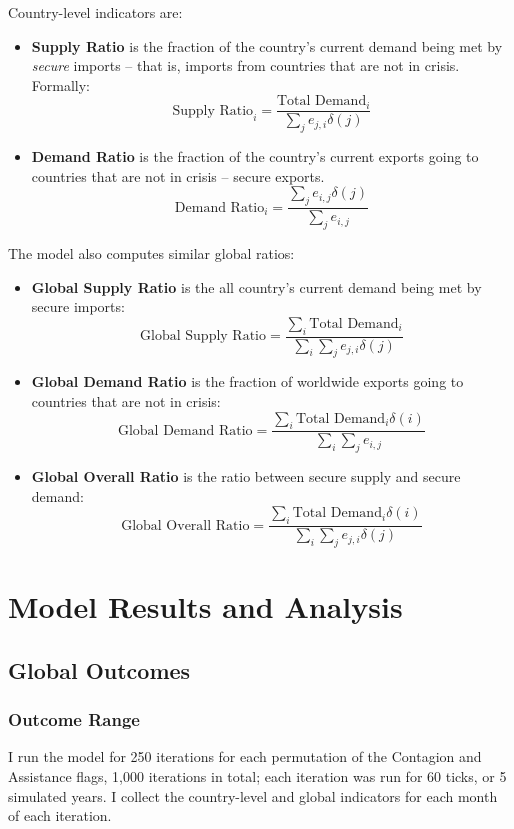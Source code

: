 \documentclass{article}
\begin{document}
Country-level indicators are:

\begin{itemize}
	\item \textbf{Supply Ratio} is the fraction of the country's current demand being met by \emph{secure} imports -- that is, imports from countries that are not in crisis. Formally:
	$$
		\text{Supply Ratio}_i = \frac{\text{Total Demand}_i}{\sum_{j}e_{j,i}\delta(j)}
	$$
\item \textbf{Demand Ratio} is the fraction of the country's current exports going to countries that are not in crisis -- secure exports. 
$$
\text{Demand Ratio}_i = \frac{\sum_{j}e_{i,j}\delta(j)}{\sum_{j}e_{i,j}}
$$
\end{itemize}

The model also computes similar global ratios:
\begin{itemize}
	\item \textbf{Global Supply Ratio} is the all country's current demand being met by secure imports:
	$$
		\text{Global Supply Ratio} = \frac{\sum_i\text{Total Demand}_i}{\sum_i\sum_{j}e_{j,i}\delta(j)}
	$$
	\item \textbf{Global Demand Ratio} is the fraction of worldwide exports going to countries that are not in crisis:
	$$
		\text{Global Demand Ratio} = \frac{\sum_i \text{Total Demand}_i\delta(i)}{\sum_i\sum_{j}e_{i,j}}
	$$
	\item \textbf{Global Overall Ratio} is the ratio between secure supply and secure demand:
	$$
		\text{Global Overall Ratio} = \frac{\sum_i \text{Total Demand}_i\delta(i)}{\sum_i\sum_{j}e_{j,i}\delta(j)}
	$$
\end{itemize}


\section{Model Results and Analysis}

\subsection{Global Outcomes}

\subsubsection{Outcome Range}

I run the model for 250 iterations for each permutation of the Contagion and Assistance flags, 1,000 iterations in total; each iteration was run for 60 ticks, or 5 simulated years. I collect the country-level and global indicators for each month of each iteration. 
\end{document}
